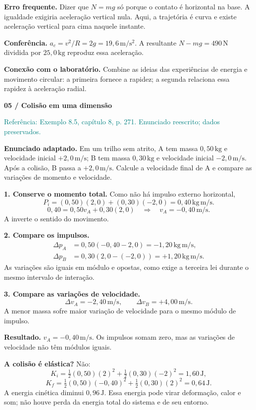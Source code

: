 \documentclass[11pt,a4paper]{article}
\newcommand{\result}[1]{\par\colorbox{pale}{\parbox{\dimexpr\linewidth-2\fboxsep}{\vspace{4pt}\textbf{Resultado.} #1\vspace{4pt}}}\par}
\newcommand{\source}[1]{{\small\textcolor{teal}{Referência: #1. Enunciado reescrito; dados preservados.}}\par}
\newcommand{\exercise}[2]{{\LARGE\bfseries\color{ink}#1}\par\vspace{3pt}{\large #2}\par\vspace{5pt}}
\begin{document}
\textbf{Erro frequente.} Dizer que $N=mg$ só porque o contato é horizontal na base. A igualdade exigiria aceleração vertical nula. Aqui, a trajetória é curva e existe aceleração vertical para cima naquele instante.

\textbf{Conferência.} $a_c=v^2/R=2g=19{,}6\,\mathrm{m/s^2}$. A resultante $N-mg=490\,\mathrm N$ dividida por $25{,}0\,\mathrm{kg}$ reproduz essa aceleração.

\textbf{Conexão com o laboratório.} Combine as ideias das experiências de energia e movimento circular: a primeira fornece a rapidez; a segunda relaciona essa rapidez à aceleração radial.

\newpage
\exercise{05 / Colisão em uma dimensão}{Impulsos iguais, velocidades diferentes}
\source{Exemplo 8.5, capítulo 8, p. 271}
\textbf{Enunciado adaptado.} Em um trilho sem atrito, A tem massa $0{,}50\,\mathrm{kg}$ e velocidade inicial $+2{,}0\,\mathrm{m/s}$; B tem massa $0{,}30\,\mathrm{kg}$ e velocidade inicial $-2{,}0\,\mathrm{m/s}$. Após a colisão, B passa a $+2{,}0\,\mathrm{m/s}$. Calcule a velocidade final de A e compare as variações de momento e velocidade.

\textbf{1. Conserve o momento total.} Como não há impulso externo horizontal,
\[
P_i=(0{,}50)(2{,}0)+(0{,}30)(-2{,}0)=0{,}40\,\mathrm{kg\,m/s}.
\]
\[
0{,}40=0{,}50v_A+0{,}30(2{,}0)
\quad\Longrightarrow\quad\boxed{v_A=-0{,}40\,\mathrm{m/s}}.
\]
A inverte o sentido do movimento.

\textbf{2. Compare os impulsos.}
\begin{align*}
\Delta p_A&=0{,}50(-0{,}40-2{,}0)=-1{,}20\,\mathrm{kg\,m/s},\\
\Delta p_B&=0{,}30(2{,}0-(-2{,}0))=+1{,}20\,\mathrm{kg\,m/s}.
\end{align*}
As variações são iguais em módulo e opostas, como exige a terceira lei durante o mesmo intervalo de interação.

\textbf{3. Compare as variações de velocidade.}
\[
\Delta v_A=-2{,}40\,\mathrm{m/s},\qquad\Delta v_B=+4{,}00\,\mathrm{m/s}.
\]
A menor massa sofre maior variação de velocidade para o mesmo módulo de impulso.
\result{$v_A=-0{,}40\,\mathrm{m/s}$. Os impulsos somam zero, mas as variações de velocidade não têm módulos iguais.}

\textbf{A colisão é elástica?} Não:
\[
K_i=\tfrac12(0{,}50)(2)^2+\tfrac12(0{,}30)(-2)^2=1{,}60\,\mathrm J,
\]
\[
K_f=\tfrac12(0{,}50)(-0{,}40)^2+\tfrac12(0{,}30)(2)^2=0{,}64\,\mathrm J.
\]
A energia cinética diminui $0{,}96\,\mathrm J$. Essa energia pode virar deformação, calor e som; não houve perda da energia total do sistema e de seu entorno.
\end{document}
